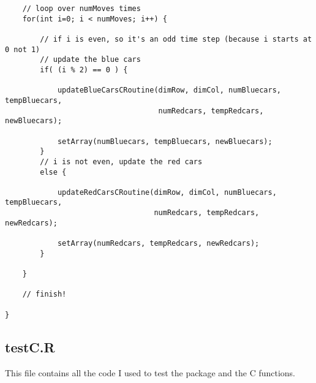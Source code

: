 \documentclass[11pt]{article}
\begin{document}
\begin{verbatim}
    // loop over numMoves times
    for(int i=0; i < numMoves; i++) {

        // if i is even, so it's an odd time step (because i starts at 0 not 1)
        // update the blue cars
        if( (i % 2) == 0 ) {

            updateBlueCarsCRoutine(dimRow, dimCol, numBluecars, tempBluecars,
                                   numRedcars, tempRedcars, newBluecars);

            setArray(numBluecars, tempBluecars, newBluecars);
        }
        // i is not even, update the red cars
        else {

            updateRedCarsCRoutine(dimRow, dimCol, numBluecars, tempBluecars,
                                  numRedcars, tempRedcars, newRedcars);

            setArray(numRedcars, tempRedcars, newRedcars);
        }

    } 

    // finish!

}
\end{verbatim}
\subsection{testC.R}
\label{sec-4-5}

   This file contains all the code I used to test the package and the
   C functions.
\end{document}
